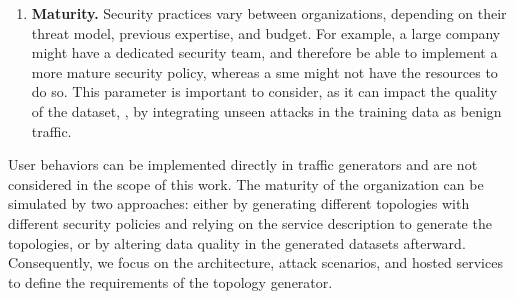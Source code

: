 \begin{enumerate}
  \item \textbf{Maturity.}
  Security practices vary between organizations, depending on their threat model, previous expertise, and budget.
  For example, a large company might have a dedicated security team, and therefore be able to implement a more mature security policy, whereas a \gls{sme} might not have the resources to do so.
  This parameter is important to consider, as it can impact the quality of the dataset, \eg, by integrating unseen attacks in the training data as benign traffic.
\end{enumerate}

User behaviors can be implemented directly in traffic generators and are not considered in the scope of this work.
The maturity of the organization can be simulated by two approaches: either by generating different topologies with different security policies and relying on the service description to generate the topologies, or by altering data quality in the generated datasets afterward.
Consequently, we focus on the architecture, attack scenarios, and hosted services to define the requirements of the topology generator.

